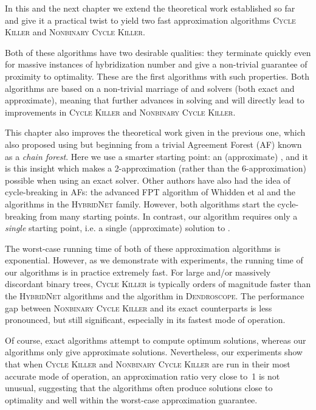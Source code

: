 


In this and the next chapter we extend the theoretical work established so far and give it a practical twist to yield two fast approximation algorithms \textsc{Cycle Killer} and \textsc{Nonbinary Cycle Killer}.

Both of these algorithms have two desirable qualities: they terminate quickly even for massive instances of hybridization number and give a non-trivial guarantee of proximity to optimality. These are the first algorithms with such properties. Both algorithms are based on a non-trivial marriage of \maf and \dfvs solvers (both exact and approximate), meaning that further advances in solving \maf and \dfvs will directly lead to improvements in \textsc{Cycle Killer} and \textsc{Nonbinary Cycle Killer}.

This chapter also improves the theoretical work given in the previous one, which also proposed using \dfvs but beginning from a trivial Agreement Forest (AF) known as a \emph{chain forest}. Here we use a smarter starting point: an (approximate) \maf, and it is this insight which makes a 2-approximation (rather than the 6-approximation) possible when using an exact \dfvs solver. Other authors have also had the idea of cycle-breaking in AFs: the advanced FPT algorithm of Whidden et al \cite{whiddenFixed} and the algorithms in the \textsc{HybridNet} family. However, both algorithms start the cycle-breaking from many starting points. In contrast, our algorithm requires only a \emph{single} starting point, i.e. a single (approximate) solution to \maf.

The worst-case running time of both of these approximation algorithms is exponential. However, as we demonstrate with experiments, the running time of our algorithms is in practice extremely fast. For large and/or massively discordant binary trees, \textsc{Cycle Killer} is typically orders of magnitude faster than the \textsc{HybridNet} algorithms and the algorithm in \textsc{Dendroscope}. The performance gap between \textsc{Nonbinary Cycle Killer} and its exact counterparts is less pronounced, but still significant, especially in its fastest mode of operation.

Of course, exact algorithms attempt to compute optimum solutions, whereas our algorithms only give approximate solutions. Nevertheless, our experiments show that when \textsc{Cycle Killer} and \textsc{Nonbinary Cycle Killer} are run in their most accurate mode of operation, an approximation ratio very close to~1 is not unusual, suggesting that the algorithms often produce solutions close to optimality and well within the worst-case approximation guarantee.

